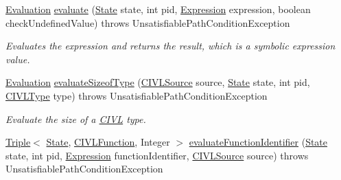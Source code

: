\begin{DoxyCompactItemize}
\item 
\hyperlink{classedu_1_1udel_1_1cis_1_1vsl_1_1civl_1_1semantics_1_1IF_1_1Evaluation}{Evaluation} \hyperlink{classedu_1_1udel_1_1cis_1_1vsl_1_1civl_1_1semantics_1_1common_1_1CommonEvaluator_a47a1a366607321c68600beb69bdb85ab}{evaluate} (\hyperlink{interfaceedu_1_1udel_1_1cis_1_1vsl_1_1civl_1_1state_1_1IF_1_1State}{State} state, int pid, \hyperlink{interfaceedu_1_1udel_1_1cis_1_1vsl_1_1civl_1_1model_1_1IF_1_1expression_1_1Expression}{Expression} expression, boolean check\+Undefined\+Value)  throws Unsatisfiable\+Path\+Condition\+Exception 
\begin{DoxyCompactList}\small\item\em Evaluates the expression and returns the result, which is a symbolic expression value. \end{DoxyCompactList}\item 
\hyperlink{classedu_1_1udel_1_1cis_1_1vsl_1_1civl_1_1semantics_1_1IF_1_1Evaluation}{Evaluation} \hyperlink{classedu_1_1udel_1_1cis_1_1vsl_1_1civl_1_1semantics_1_1common_1_1CommonEvaluator_a8893314efaf52d49a2d3db62baa5b200}{evaluate\+Sizeof\+Type} (\hyperlink{interfaceedu_1_1udel_1_1cis_1_1vsl_1_1civl_1_1model_1_1IF_1_1CIVLSource}{C\+I\+V\+L\+Source} source, \hyperlink{interfaceedu_1_1udel_1_1cis_1_1vsl_1_1civl_1_1state_1_1IF_1_1State}{State} state, int pid, \hyperlink{interfaceedu_1_1udel_1_1cis_1_1vsl_1_1civl_1_1model_1_1IF_1_1type_1_1CIVLType}{C\+I\+V\+L\+Type} type)  throws Unsatisfiable\+Path\+Condition\+Exception 
\begin{DoxyCompactList}\small\item\em Evaluate the size of a \hyperlink{classedu_1_1udel_1_1cis_1_1vsl_1_1civl_1_1CIVL}{C\+I\+V\+L} type. \end{DoxyCompactList}\item 
\hyperlink{classedu_1_1udel_1_1cis_1_1vsl_1_1civl_1_1util_1_1IF_1_1Triple}{Triple}$<$ \hyperlink{interfaceedu_1_1udel_1_1cis_1_1vsl_1_1civl_1_1state_1_1IF_1_1State}{State}, \hyperlink{interfaceedu_1_1udel_1_1cis_1_1vsl_1_1civl_1_1model_1_1IF_1_1CIVLFunction}{C\+I\+V\+L\+Function}, Integer $>$ \hyperlink{classedu_1_1udel_1_1cis_1_1vsl_1_1civl_1_1semantics_1_1common_1_1CommonEvaluator_adc6dd5399e2a536cf06bf24c3d6b4bf9}{evaluate\+Function\+Identifier} (\hyperlink{interfaceedu_1_1udel_1_1cis_1_1vsl_1_1civl_1_1state_1_1IF_1_1State}{State} state, int pid, \hyperlink{interfaceedu_1_1udel_1_1cis_1_1vsl_1_1civl_1_1model_1_1IF_1_1expression_1_1Expression}{Expression} function\+Identifier, \hyperlink{interfaceedu_1_1udel_1_1cis_1_1vsl_1_1civl_1_1model_1_1IF_1_1CIVLSource}{C\+I\+V\+L\+Source} source)  throws Unsatisfiable\+Path\+Condition\+Exception 

\end{DoxyCompactItemize}
